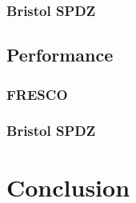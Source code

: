 \subsubsection{Bristol SPDZ}


\subsection{Performance}

\subsubsection{FRESCO}

\subsubsection{Bristol SPDZ}


\section{Conclusion}
\label{sec:conclusion}


